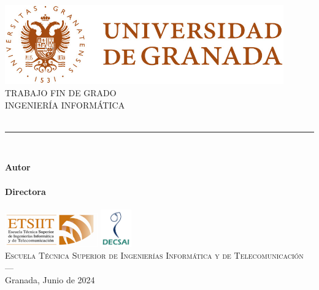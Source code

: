 \begin{titlepage}
 
\newlength{\centeroffset}
\setlength{\centeroffset}{-0.5\oddsidemargin}
\addtolength{\centeroffset}{0.5\evensidemargin}
\thispagestyle{empty}

\noindent\hspace*{\centeroffset}\begin{minipage}{\textwidth}

\centering
\includegraphics[width=0.9\textwidth]{imagenes/logoUGR.jpg}\\[1.4cm]

\textsc{ \Large TRABAJO FIN DE GRADO\\[0.2cm]}
\textsc{ INGENIERÍA INFORMÁTICA}\\[1cm]

{\LARGE \bfseries \myTitle \\}
\noindent\rule[-1ex]{\textwidth}{3pt}\\[3.5ex]
{\large\bfseries \mySubTitle}
\end{minipage}

\vspace{2.5cm}
\noindent\hspace*{\centeroffset}\begin{minipage}{\textwidth}
\centering

\textbf{Autor}\\ {\myName}\\[2.5ex]
\textbf{Directora}\\
{\myProf}\\[2cm]
\includegraphics[width=0.3\textwidth]{imagenes/etsiit_logo.png}\hspace{1.0cm}
\includegraphics[width=0.1\textwidth]{imagenes/decsai_logo.png}\\[0.25cm]
\textsc{Escuela Técnica Superior de Ingenierías Informática y de Telecomunicación}\\
\textsc{---}\\
Granada, Junio de 2024
\end{minipage}
\end{titlepage}


